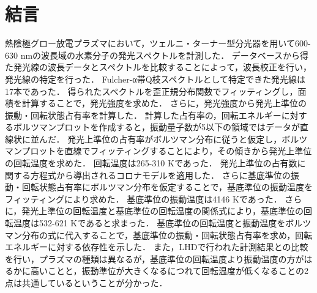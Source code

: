 \chapter{結言}

熱陰極グロー放電プラズマにおいて，ツェルニ・ターナー型分光器を用いて600-630 nmの波長域の水素分子の発光スペクトルを計測した．
データベースから得た発光線の波長データとスペクトルを比較することによって，波長校正を行い，発光線の特定を行った．
Fulcher-α帯Q枝スペクトルとして特定できた発光線は17本であった．
得られたスペクトルを歪正規分布関数でフィッティングし，面積を計算することで，発光強度を求めた．
さらに，発光強度から発光上準位の振動・回転状態占有率を計算した．
計算した占有率の，回転エネルギーに対するボルツマンプロットを作成すると，振動量子数が5以下の領域ではデータが直線状に並んだ．
発光上準位の占有率がボルツマン分布に従うと仮定し，ボルツマンプロットを直線でフィッティングすることにより，その傾きから発光上準位の回転温度を求めた．
回転温度は265-310 Kであった．
発光上準位の占有数に関する方程式から導出されるコロナモデルを適用した．
さらに基底準位の振動・回転状態占有率にボルツマン分布を仮定することで，基底準位の振動温度をフィッティングにより求めた．
基底準位の振動温度は4146 Kであった．
さらに，発光上準位の回転温度と基底準位の回転温度の関係式により，基底準位の回転温度は532-621 Kであると求まった．
基底準位の回転温度と振動温度をボルツマン分布の式に代入することで，基底準位の振動・回転状態占有率を求め，回転エネルギーに対する依存性を示した．
また，LHDで行われた計測結果との比較を行い，プラズマの種類は異なるが，基底準位の回転温度より振動温度の方がはるかに高いことと，振動準位が大きくなるにつれて回転温度が低くなることの2点は共通しているということが分かった．